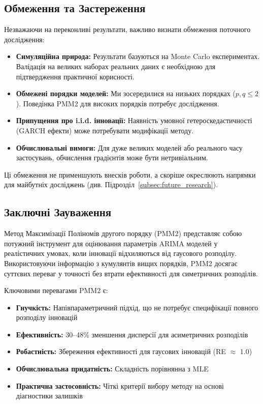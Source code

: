 \documentclass[12pt,a4paper]{article}
\begin{document}
\subsection{Обмеження та Застереження}
\label{subsec:caveats}

Незважаючи на переконливі результати, важливо визнати обмеження поточного дослідження:

\begin{itemize}
    \item \textbf{Симуляційна природа:} Результати базуються на Monte Carlo експериментах. Валідація на великих наборах реальних даних є необхідною для підтвердження практичної корисності.

    \item \textbf{Обмежені порядки моделей:} Ми зосередилися на низьких порядках ($p, q \leq 2$). Поведінка PMM2 для високих порядків потребує дослідження.

    \item \textbf{Припущення про i.i.d. інновації:} Наявність умовної гетероскедастичності (GARCH ефекти) може потребувати модифікації методу.

    \item \textbf{Обчислювальні вимоги:} Для дуже великих моделей або реального часу застосувань, обчислення градієнтів може бути нетривіальним.
\end{itemize}

Ці обмеження не применшують внесків роботи, а скоріше окреслюють напрямки для майбутніх досліджень (див. Підрозділ~\ref{subsec:future_research}).

\subsection{Заключні Зауваження}
\label{subsec:final_remarks}

Метод Максимізації Поліномів другого порядку (PMM2) представляє собою потужний інструмент для оцінювання параметрів ARIMA моделей у реалістичних умовах, коли інновації відхиляються від гаусового розподілу. Використовуючи інформацію з кумулянтів вищих порядків, PMM2 досягає суттєвих переваг у точності без втрати ефективності для симетричних розподілів.

Ключовими перевагами PMM2 є:
\begin{itemize}
    \item \textbf{Гнучкість:} Напівпараметричний підхід, що не потребує специфікації повного розподілу інновацій
    \item \textbf{Ефективність:} 30--48\% зменшення дисперсії для асиметричних розподілів
    \item \textbf{Робастність:} Збереження ефективності для гаусових інновацій (RE $\approx$ 1.0)
    \item \textbf{Обчислювальна придатність:} Складність порівнянна з MLE
    \item \textbf{Практична застосовність:} Чіткі критерії вибору методу на основі діагностики залишків
\end{itemize}
\end{document}
